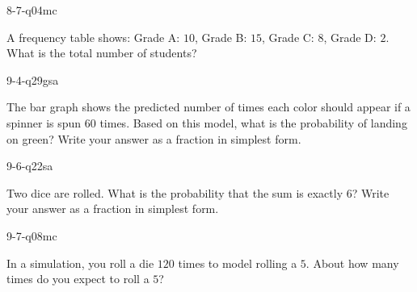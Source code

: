 \begin{practiceQuestion}{8-7-q04}{mc}
\begin{questionText}
A frequency table shows: Grade A: $10$, Grade B: $15$, Grade C: $8$, Grade D: $2$. What is the total number of students?
\end{questionText}
\end{practiceQuestion}

\begin{practiceQuestion}{9-4-q29}{gsa}
\begin{questionText}
The bar graph shows the predicted number of times each color should appear if a spinner is spun $60$ times. Based on this model, what is the probability of landing on green? Write your answer as a fraction in simplest form.

\begin{center}
\end{center}
\end{questionText}
\end{practiceQuestion}

\begin{practiceQuestion}{9-6-q22}{sa}
\begin{questionText}
Two dice are rolled. What is the probability that the sum is exactly $6$? Write your answer as a fraction in simplest form.
\end{questionText}
\end{practiceQuestion}

\begin{practiceQuestion}{9-7-q08}{mc}
\begin{questionText}
In a simulation, you roll a die $120$ times to model rolling a $5$. About how many times do you expect to roll a $5$?
\end{questionText}
\end{practiceQuestion}

